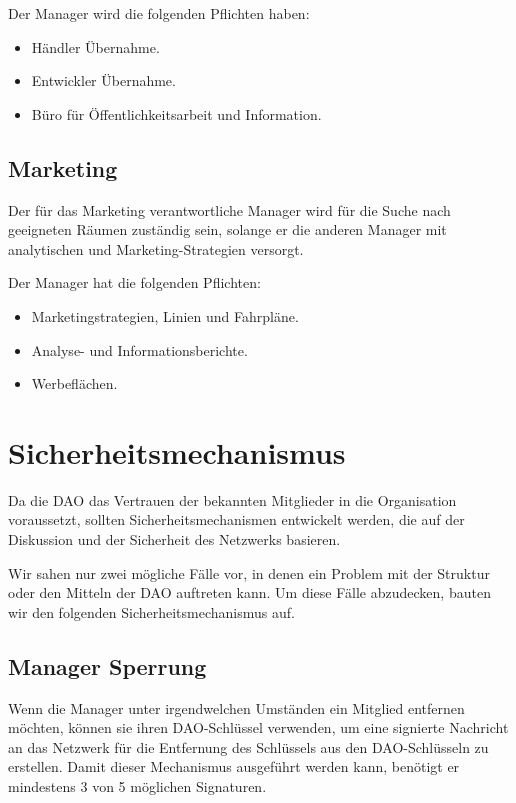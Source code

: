 \documentclass{article}
\begin{document}
Der Manager wird die folgenden Pflichten haben:

\begin{itemize}
  \item Händler Übernahme.
  \item Entwickler Übernahme.
  \item Büro für Öffentlichkeitsarbeit und Information.
\end{itemize}

\subsection{Marketing}

Der für das Marketing verantwortliche Manager wird für die Suche nach geeigneten Räumen zuständig sein, solange er die anderen Manager mit analytischen und Marketing-Strategien versorgt.

Der Manager hat die folgenden Pflichten:

\begin{itemize}
  \item Marketingstrategien, Linien und Fahrpläne.
  \item Analyse- und Informationsberichte.
  \item Werbeflächen.
\end{itemize}

\section{Sicherheitsmechanismus}

Da die DAO das Vertrauen der bekannten Mitglieder in die Organisation voraussetzt, sollten Sicherheitsmechanismen entwickelt werden, die auf der Diskussion und der Sicherheit des Netzwerks basieren.

Wir sahen nur zwei mögliche Fälle vor, in denen ein Problem mit der Struktur oder den Mitteln der DAO auftreten kann. Um diese Fälle abzudecken, bauten wir den folgenden Sicherheitsmechanismus auf.

\subsection{Manager Sperrung}

Wenn die Manager unter irgendwelchen Umständen ein Mitglied entfernen möchten, können sie ihren DAO-Schlüssel verwenden, um eine signierte Nachricht an das Netzwerk für die Entfernung des Schlüssels aus den DAO-Schlüsseln zu erstellen. Damit dieser Mechanismus ausgeführt werden kann, benötigt er mindestens 3 von 5 möglichen Signaturen.
\end{document}
